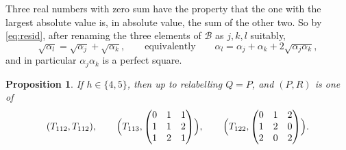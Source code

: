 \documentclass[11pt,a4paper]{amsart}
\newtheorem{proposition}[theorem]{Proposition}
\theoremstyle{definition}
\theoremstyle{remark}
\newcommand{\cB}{\mathcal{B}}
\begin{document}
Three real numbers with zero sum have the property that the one with the largest absolute value is, in
absolute value, the sum of the other two. So by \eqref{eq:resid}, after renaming the three elements of $\cB$
as $j,k,l$ suitably,
\begin{equation}\label{eq:sqrt}
\sqrt{\alpha_l}=\sqrt{\alpha_j}+\sqrt{\alpha_k},\qquad\text{equivalently}\qquad
\alpha_l=\alpha_j+\alpha_k+2\sqrt{\alpha_j\alpha_k},
\end{equation}
and in particular $\alpha_j\alpha_k$ is a perfect square.

\begin{proposition}\label{prop:h45}
If $h\in\{4,5\}$, then up to relabelling $Q=P$, and $(P,R)$ is one of
\[
(T_{112},T_{112}),\qquad \Bigl(T_{113},\begin{pmatrix}0&1&1\\1&1&2\\1&2&1\end{pmatrix}\Bigr),\qquad
\Bigl(T_{122},\begin{pmatrix}0&1&2\\1&2&0\\2&0&2\end{pmatrix}\Bigr).
\]
\end{proposition}
\end{document}
